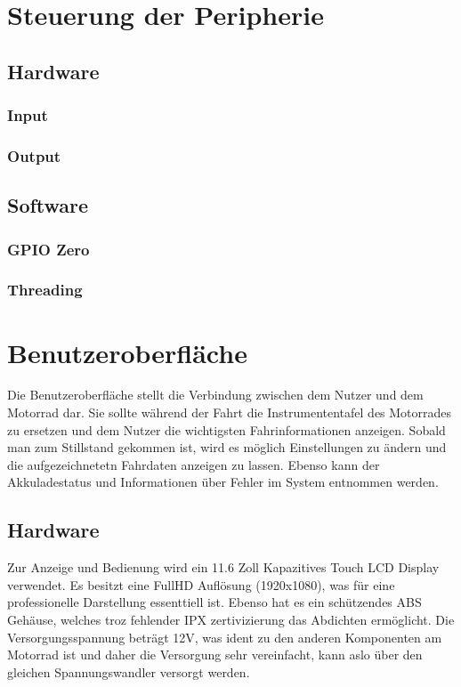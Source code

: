 \section{Steuerung der Peripherie}
\subsection{Hardware}
\subsubsection{Input}
\subsubsection{Output}

\subsection{Software}
\subsubsection{GPIO Zero}
\subsubsection{Threading}

\newpage


\section{Benutzeroberfläche}
Die Benutzeroberfläche stellt die Verbindung zwischen dem Nutzer und dem Motorrad dar. Sie sollte während der Fahrt die Instrumententafel des Motorrades zu ersetzen und dem Nutzer die wichtigsten Fahrinformationen anzeigen. Sobald man zum Stillstand gekommen ist, wird es möglich Einstellungen zu ändern und die aufgezeichnetetn Fahrdaten anzeigen zu lassen. Ebenso kann der Akkuladestatus und Informationen über Fehler im System entnommen werden.
\subsection{Hardware}
Zur Anzeige und Bedienung wird ein 11.6 Zoll Kapazitives Touch LCD Display verwendet. Es besitzt eine FullHD Auflösung (1920x1080), was für eine professionelle Darstellung essenttiell ist. Ebenso hat es ein schützendes ABS Gehäuse, welches troz fehlender IPX zertivizierung das Abdichten ermöglicht. Die Versorgungsspannung beträgt 12V, was ident zu den anderen Komponenten am Motorrad ist und daher die Versorgung sehr vereinfacht, kann aslo über den gleichen Spannungswandler versorgt werden.
